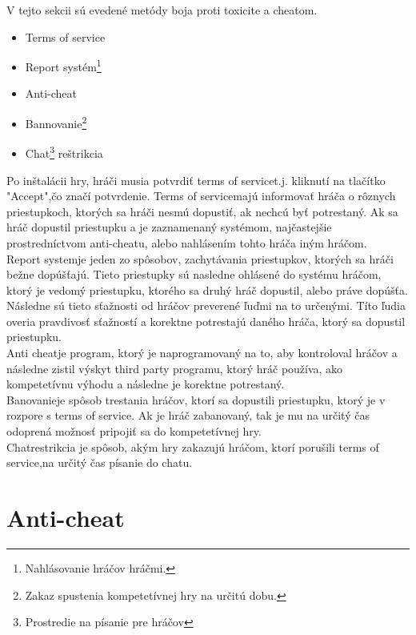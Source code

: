 \documentclass[twoside,twocolumn]{article}
\begin{document}
V tejto sekcii sú evedené metódy boja proti toxicite a cheatom\footnotemark[1].
\begin{itemize}
\item Terms of service\footnotemark[2] 
\item Report systém\footnote[6]{Nahlásovanie hráčov hráčmi.}
\item Anti-cheat\footnotemark[3]
\item Bannovanie\footnote[7]{Zakaz spustenia kompetetívnej hry na určitú dobu.}
\item Chat\footnote[8]{Prostredie na písanie pre hráčov} reštrikcia
\end{itemize}
	Po inštalácii hry, hráči musia potvrdiť terms of service\footnotemark[2]t.j. kliknutí na tlačítko "Accept",čo značí potvrdenie. Terms of service\footnotemark[2] majú informovať hráča o rôznych priestupkoch, ktorých sa hráči nesmú dopustiť, ak nechcú byť potrestaný. Ak sa hráč dopustil priestupku a je zaznamenaný systémom, najčastejšie prostredníctvom anti-cheatu\footnotemark[3], alebo nahlásením tohto hráča iným hráčom.\\
	Report system\footnotemark[6] je jeden zo spôsobov, zachytávania priestupkov, ktorých sa hráči bežne dopúšťajú. Tieto priestupky sú nasledne ohlásené do systému hráčom, ktorý je vedomý priestupku, ktorého sa druhý hráč dopustil, alebo práve dopúšťa. Následne sú tieto sťažnosti od hráčov preverené ľuďmi na to určenými. Títo ľudia overia pravdivosť sťažností a korektne potrestajú daného hráča, ktorý sa dopustil priestupku.\\
	Anti cheat\footnotemark[3] je program, ktorý je naprogramovaný na to, aby kontroloval hráčov a následne zistil výskyt third party programu\footnotemark[4], ktorý hráč používa, ako kompetetívnu výhodu a následne je korektne potrestaný.\\
	Banovanie\footnotemark[7] je spôsob trestania hráčov, ktorí sa dopustili priestupku, ktorý je v rozpore s terms of service\footnotemark[2]. Ak je hráč zabanovaný\footnotemark[7], tak je mu na určitý čas odoprená možnosť pripojiť sa do kompetetívnej hry.\\
	Chat\footnotemark[8] restrikcia je spôsob, akým hry zakazujú hráčom, ktorí porušili terms of service\footnotemark[2],na určitý čas písanie do chatu.


\section{Anti-cheat}
\end{document}
